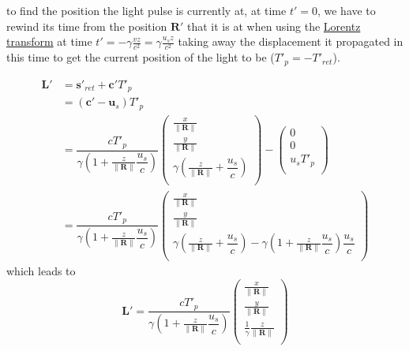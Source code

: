 to find the position the light pulse is currently at, at time $t'=0$, we have to rewind its time from the position $\mathbf{R}'$ that it is at when using the \hyperlink{def-lorentz-transform}{Lorentz transform} at time $t'= -\gamma\frac{vz}{c^2}= \gamma\frac{u_s z}{c^2}$ taking away the displacement it propagated in this time to get the current position of the light to be ($T'_{p}=- T'_{ret}$).

\begin{equation}
	\begin{split}
		\mathbf{L}'
		 & = \mathbf{s}'_{ret} + \mathbf{c}'T'_{p}
		\\
		 & = \left( \mathbf{c}' - \mathbf{u}_s \right)T'_{p}
		\\
		 & = \dfrac{c T'_{p}}{\gamma\left(1 + \frac{z}{\|\mathbf{R}\|} \dfrac{u_s}{c} \right)}
		\begin{pmatrix}
			\frac{x}{\|\mathbf{R}\|}                                        \\
			\frac{y}{\|\mathbf{R}\|}                                        \\
			\gamma \left( \frac{z}{\|\mathbf{R}\|} + \dfrac{u_s}{c} \right) \\
		\end{pmatrix}
		-
		\begin{pmatrix}
			0          \\
			0          \\
			u_s T'_{p} \\
		\end{pmatrix}
		\\
		 & = \dfrac{c T'_{p}}{\gamma\left(1 + \frac{z}{\|\mathbf{R}\|} \dfrac{u_s}{c} \right)}
		\begin{pmatrix}
			\frac{x}{\|\mathbf{R}\|}                                                                                                                         \\
			\frac{y}{\|\mathbf{R}\|}                                                                                                                         \\
			\gamma \left( \frac{z}{\|\mathbf{R}\|} + \dfrac{u_s}{c} \right) - \gamma\left(1 + \frac{z}{\|\mathbf{R}\|} \dfrac{u_s}{c} \right) \dfrac{u_s}{c} \\
		\end{pmatrix}
	\end{split}
\end{equation}
which leads to
\begin{equation}
	\mathbf{L}' = \dfrac{c T'_{p}}{\gamma\left(1 + \frac{z}{\|\mathbf{R}\|} \dfrac{u_s}{c} \right)}
	\begin{pmatrix}
		\frac{x}{\|\mathbf{R}\|}                  \\
		\frac{y}{\|\mathbf{R}\|}                  \\
		\frac{1}{\gamma} \frac{z}{\|\mathbf{R}\|} \\
	\end{pmatrix}
\end{equation}
